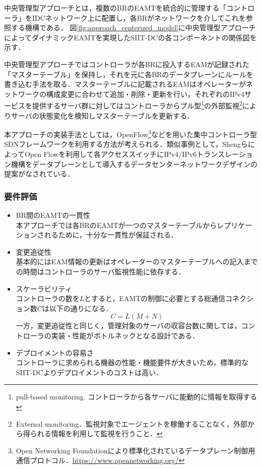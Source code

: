 中央管理型アプローチとは，複数のBRのEAMTを統合的に管理する「コントローラ」をIDCネットワーク上に配置し，各BRがネットワークを介してこれを参照する機構である．
図\ref{fig:approach_centerized_model}に中央管理型アプローチによってダイナミックEAMTを実現したSIIT-DCの各コンポーネントの関係図を示す．

中央管理型アプローチではコントローラが各BRに投入するEAMが記録された「マスターテーブル」を保持し，それを元に各BRのデータプレーンにルールを書き込む手法を取る．マスターテーブルに記載されるEAMはオペレーターがネットワークの構成変更に合わせて追加・削除・更新を行い，それぞれのIPv4サービスを提供するサーバ群に対してはコントローラからプル型\footnote{pull-based monitoring. コントローラから各サーバに能動的に情報を取得する}の外部監視\footnote{External monitoring．監視対象でエージェントを稼働することなく，外部から得られる情報を利用して監視を行うこと．}によりサーバの状態変化を検知しマスターテーブルを更新する．

本アプローチの実装手法としては，OpenFlow\footnote{Open Networking Foundationにより標準化されているデータプレーン制御用通信プロトコル．\url{https://www.opennetworking.org/}}などを用いた集中コントローラ型SDNフレームワークを利用する方法が考えられる\cite{RFC7426}．類似事例として，ShengらによってOpen Flowを利用して各アクセススイッチにIPv4/IPv6トランスレーション機構をデータプレーンとして導入するデータセンターネットワークデザインの提案がなされている\cite{7560347}．


\subsubsection{要件評価}

\begin{itemize}
    \item BR間のEAMTの一貫性 \\
    本アプローチでは各BRのEAMTが一つのマスターテーブルからレプリケーションされるために，十分な一貫性が保証される．
    \item 変更追従性 \\
    基本的にはEAM情報の更新はオペレーターのマスターテーブルへの記入までの時間はコントローラのサーバ監視性能に依存する．
    \item スケーラビリティ　\\
    コントローラの数を$L$とすると，EAMTの制御に必要とする総通信コネクション数$C$は以下の通りになる．
    \begin{equation}
        C = L(M + N)
    \end{equation}
    一方，変更追従性と同じく，管理対象のサーバの収容台数に関しては，コントローラの実装・性能がボトルネックとなる設計である．
    \item デプロイメントの容易さ　\\
    コントローラに求められる機器の性能・機能要件が大きいため，標準的なSIIT-DCよりデプロイメントのコストは高い．

\end{itemize}



